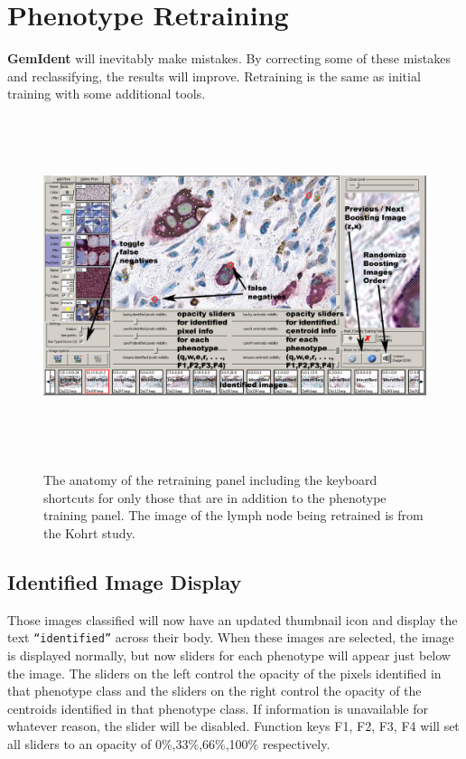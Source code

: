 \documentclass[12pt]{article}
\begin{document}
\section{Phenotype Retraining}

{\bf GemIdent} will inevitably make mistakes. By correcting some of these mistakes and reclassifying, the results will improve. Retraining is the same as initial training with some additional tools.


\begin{figure}[htp]
\centering
\includegraphics[width=476pt,height=281pt]{phenotyperetraining.jpg}
\label{fig:retraining}
\caption{\sf The anatomy of the retraining panel including the keyboard shortcuts for only those that are in addition to the {\sf phenotype training} panel. The image of the lymph node being retrained is from the Kohrt study\cite{kohrt}.}
\end{figure}

\subsection{Identified Image Display}

Those images classified will now have an updated thumbnail icon and display the text {\tt ``identified''} across their body. When these images are selected, the image is displayed normally, but now sliders for each phenotype will appear just below the image. The sliders on the left control the opacity of the pixels identified in that phenotype class and the sliders on the right control the opacity of the centroids identified in that phenotype class. If information is unavailable for whatever reason, the slider will be disabled. Function keys F1, F2, F3, F4 will set all sliders to an opacity of 0\%,33\%,66\%,100\% respectively.
\end{document}
